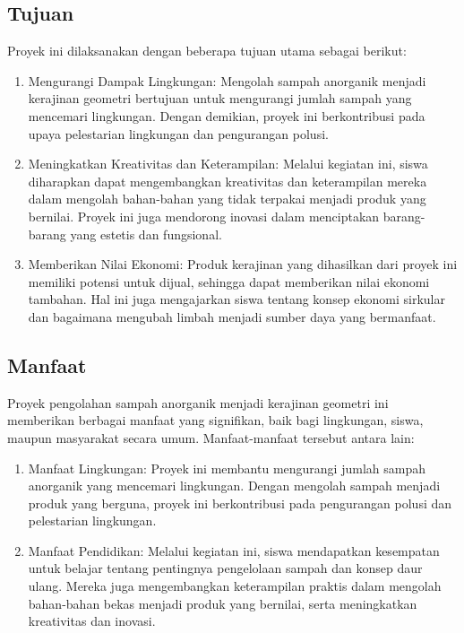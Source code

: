 \documentclass[a4paper,12pt]{article}
\begin{document}
\subsection{Tujuan}
Proyek ini dilaksanakan dengan beberapa tujuan utama sebagai berikut:  
\begin{enumerate}
    \item     Mengurangi Dampak Lingkungan: Mengolah sampah anorganik menjadi kerajinan geometri bertujuan untuk mengurangi jumlah sampah yang mencemari lingkungan. Dengan demikian, proyek ini berkontribusi pada upaya pelestarian lingkungan dan pengurangan polusi. 
    \item Meningkatkan Kreativitas dan Keterampilan: Melalui kegiatan ini, siswa diharapkan dapat mengembangkan kreativitas dan keterampilan mereka dalam mengolah bahan-bahan yang tidak terpakai menjadi produk yang bernilai. Proyek ini juga mendorong inovasi dalam menciptakan barang-barang yang estetis dan fungsional. 
    \item     Memberikan Nilai Ekonomi: Produk kerajinan yang dihasilkan dari proyek ini memiliki potensi untuk dijual, sehingga dapat memberikan nilai ekonomi tambahan. Hal ini juga mengajarkan siswa tentang konsep ekonomi sirkular dan bagaimana mengubah limbah menjadi sumber daya yang bermanfaat. 
\end{enumerate}

\subsection{Manfaat}
Proyek pengolahan sampah anorganik menjadi kerajinan geometri ini memberikan berbagai manfaat yang signifikan, baik bagi lingkungan, siswa, maupun masyarakat secara umum. Manfaat-manfaat tersebut antara lain: 
\begin{enumerate}
    \item     Manfaat Lingkungan: Proyek ini membantu mengurangi jumlah sampah anorganik yang mencemari lingkungan. Dengan mengolah sampah menjadi produk yang berguna, proyek ini berkontribusi pada pengurangan polusi dan pelestarian lingkungan. 
    \item     Manfaat Pendidikan: Melalui kegiatan ini, siswa mendapatkan kesempatan untuk belajar tentang pentingnya pengelolaan sampah dan konsep daur ulang. Mereka juga mengembangkan keterampilan praktis dalam mengolah bahan-bahan bekas menjadi produk yang bernilai, serta meningkatkan kreativitas dan inovasi. 
\end{enumerate}
\end{document}
